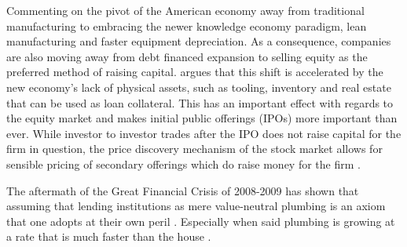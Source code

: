 	Commenting on the pivot of the American economy away from traditional manufacturing to embracing the newer knowledge economy paradigm, lean manufacturing and faster equipment depreciation.  As a consequence, companies are also moving away from debt financed expansion to selling equity as the preferred method of raising capital. 	\cite{Graves2003} argues that this shift is accelerated by the new economy's lack of physical assets, such as tooling, inventory and real estate that can be used as loan collateral. This has an important effect with regards to the equity market and makes initial public offerings (IPOs) more important than ever. While investor to investor trades after the IPO does not raise capital for the firm in question, the price discovery mechanism of the stock market allows for sensible pricing of secondary offerings which do raise money for the firm \citep{Tobin1969}.  
	
	
	The aftermath of the Great Financial Crisis of 2008-2009 has shown that assuming that lending institutions as mere value-neutral plumbing is an axiom that one adopts at their own peril \citep{Krugman2012blog}.  Especially when said plumbing is growing at a rate that is much faster than the house .  